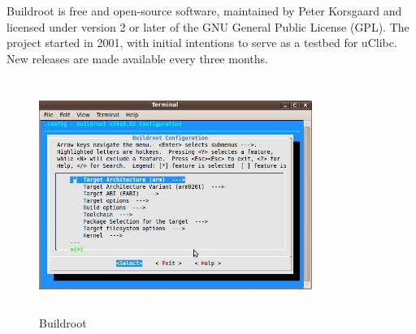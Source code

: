 Buildroot is free and open-source software, maintained by Peter Korsgaard and licensed under version 2 or later of the GNU General Public License (GPL). The project started in 2001, with initial intentions to serve as a testbed for uClibc. New releases are made available every three months.
\begin{figure}[ht]
	\centering
	\includegraphics[width=3.5in, height=3in]{images/buildroot.png}
	\caption{Buildroot}
\end{figure}
